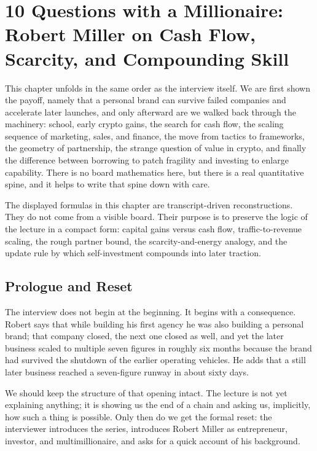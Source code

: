 \chapter{10 Questions with a Millionaire: Robert Miller on Cash Flow, Scarcity, and Compounding Skill}

This chapter unfolds in the same order as the interview itself. We are first shown the payoff, namely that a personal brand can survive failed companies and accelerate later launches, and only afterward are we walked back through the machinery: school, early crypto gains, the search for cash flow, the scaling sequence of marketing, sales, and finance, the move from tactics to frameworks, the geometry of partnership, the strange question of value in crypto, and finally the difference between borrowing to patch fragility and investing to enlarge capability. There is no board mathematics here, but there is a real quantitative spine, and it helps to write that spine down with care.

\begin{remark}
The displayed formulas in this chapter are transcript-driven reconstructions. They do not come from a visible board. Their purpose is to preserve the logic of the lecture in a compact form: capital gains versus cash flow, traffic-to-revenue scaling, the rough partner bound, the scarcity-and-energy analogy, and the update rule by which self-investment compounds into later traction.
\end{remark}

\section{Prologue and Reset}

The interview does not begin at the beginning. It begins with a consequence. Robert says that while building his first agency he was also building a personal brand; that company closed, the next one closed as well, and yet the later business scaled to multiple seven figures in roughly six months because the brand had survived the shutdown of the earlier operating vehicles. He adds that a still later business reached a seven-figure runway in about sixty days.

We should keep the structure of that opening intact. The lecture is not yet explaining anything; it is showing us the end of a chain and asking us, implicitly, how such a thing is possible. Only then do we get the formal reset: the interviewer introduces the series, introduces Robert Miller as entrepreneur, investor, and multimillionaire, and asks for a quick account of his background.

